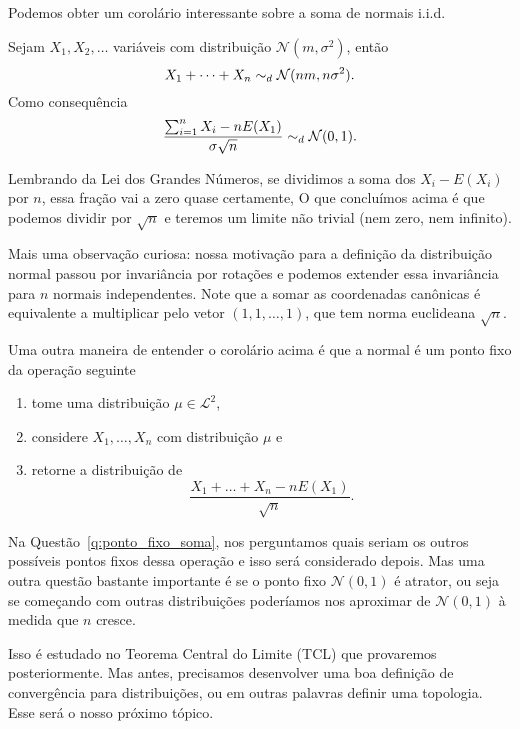 Podemos obter um corolário interessante sobre a soma de normais i.i.d.
\begin{corollary}
  \label{c:normaliz_normais}
  Sejam $X_1, X_2, \dots$ variáveis \iid com distribuição $\mathcal{N}(m,\sigma^2)$, então
  \begin{equation}
    X_1 + \dots + X_n \sim_d \mathcal{N}(nm, n \sigma^2).
  \end{equation}
  Como consequência
  \begin{equation}
    \frac{\sum_{i=1}^n X_i - n E(X_1)}{\sigma \sqrt{n}} \sim_d \mathcal{N}(0,1).
  \end{equation}
\end{corollary}

Lembrando da Lei dos Grandes Números, se dividimos a soma dos $X_i - E(X_i)$ por $n$, essa fração vai a zero quase certamente,
O que concluímos acima é que podemos dividir por $\sqrt{n}$ e teremos um limite não trivial (nem zero, nem infinito).

Mais uma observação curiosa: nossa motivação para a definição da distribuição normal passou por invariância por rotações e podemos extender essa invariância para $n$ normais independentes.
Note que a somar as coordenadas canônicas é equivalente a multiplicar pelo vetor $(1,1,\dots,1)$, que tem norma euclideana $\sqrt{n}$.

Uma outra maneira de entender o corolário acima é que a normal é um ponto fixo da operação seguinte
\begin{enumerate}[\quad a)]
\item tome uma distribuição $\mu \in \mathcal{L}^2$,
\item considere $X_1, \dots, X_n$ \iid com distribuição $\mu$ e
\item retorne a distribuição de
  \begin{equation}
    \frac{X_1 + \dots + X_n - n E(X_1)}{\sqrt{n}}.
  \end{equation}
\end{enumerate}

Na Questão~\ref{q:ponto_fixo_soma}, nos perguntamos quais seriam os outros possíveis pontos fixos dessa operação e isso será considerado depois.
Mas uma outra questão bastante importante é se o ponto fixo $\mathcal{N}(0,1)$ é atrator, ou seja se começando com outras distribuições poderíamos nos aproximar de $\mathcal{N}(0,1)$ à medida que $n$ cresce.

Isso é estudado no Teorema Central do Limite (TCL) que provaremos posteriormente.
Mas antes, precisamos desenvolver uma boa definição de convergência para distribuições, ou em outras palavras definir uma topologia.
Esse será o nosso próximo tópico.

